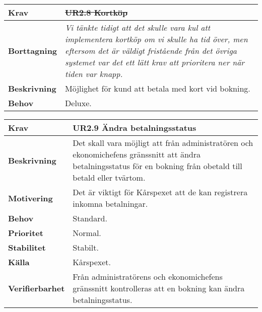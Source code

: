 \documentclass[a4paper, twoside, 11pt, titlepage]{article}
\begin{document}
		\begin {table} [ht] \begin{tabular} { p{2.6cm} p{12.5cm} }
			\hline
			{\sffamily\textbf{Krav}} & {\sffamily\textbf{\sout{UR2.8 Kortköp}}} \\
			\hline
			{\sffamily\textbf{Borttagning}} & {\emph{Vi tänkte tidigt att det skulle vara kul att implementera kortköp om vi skulle ha tid över, men eftersom det är väldigt fristående från det övriga systemet var det ett lätt krav att prioritera ner när tiden var knapp.}} \\
			\hline
			{\sffamily\textbf{Beskrivning}} & {Möjlighet för kund att betala med kort vid bokning.} \\
			\hline
			{\sffamily\textbf{Behov}} & {Deluxe.} \\
			\hline
		\end{tabular} \end{table} \FloatBarrier
		\vspace{6mm}

		\begin {table} [ht] \begin{tabular} { p{2.6cm} p{12.5cm} }
			\hline
			{\sffamily\textbf{Krav}} & {\sffamily\textbf{UR2.9 Ändra betalningsstatus }} \\
			\hline
			{\sffamily\textbf{Beskrivning}} & {Det skall vara möjligt att från administratören och ekonomichefens gränssnitt att ändra betalningsstatus för en bokning från obetald till betald eller tvärtom.} \\
			\hline
			{\sffamily\textbf{Motivering}} & {Det är viktigt för Kårspexet att de kan registrera inkomna betalningar.} \\
			\hline
			{\sffamily\textbf{Behov}} & {Standard.} \\
			\hline
			{\sffamily\textbf{Prioritet}} & {Normal.} \\
			\hline
			{\sffamily\textbf{Stabilitet}} & {Stabilt.} \\
			\hline
			{\sffamily\textbf{Källa}} & {Kårspexet.} \\
			\hline
			{\sffamily\textbf{Verifierbarhet}} & {Från administratörens och ekonomichefens gränssnitt kontrolleras att en bokning kan ändra betalningsstatus.} \\
			\hline
		\end{tabular} \end{table} \FloatBarrier
		\vspace{6mm}
\end{document}
